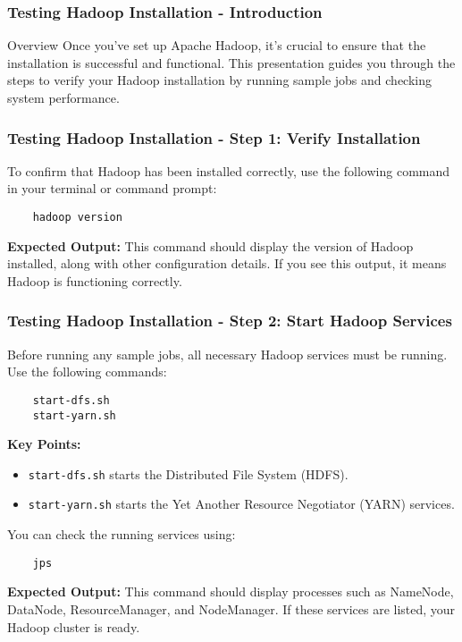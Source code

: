 \documentclass{beamer}
\begin{document}
\begin{frame}
    \frametitle{Testing Hadoop Installation - Introduction}
    \begin{block}{Overview}
        Once you've set up Apache Hadoop, it's crucial to ensure that the installation is successful and functional. 
        This presentation guides you through the steps to verify your Hadoop installation by running sample jobs and checking system performance.
    \end{block}
\end{frame}

\begin{frame}[fragile]
    \frametitle{Testing Hadoop Installation - Step 1: Verify Installation}
    To confirm that Hadoop has been installed correctly, use the following command in your terminal or command prompt:

    \begin{lstlisting}
    hadoop version
    \end{lstlisting}

    \textbf{Expected Output:} 
    This command should display the version of Hadoop installed, along with other configuration details. If you see this output, it means Hadoop is functioning correctly.
\end{frame}

\begin{frame}[fragile]
    \frametitle{Testing Hadoop Installation - Step 2: Start Hadoop Services}
    Before running any sample jobs, all necessary Hadoop services must be running. Use the following commands:

    \begin{lstlisting}
    start-dfs.sh
    start-yarn.sh
    \end{lstlisting}

    \textbf{Key Points:}
    \begin{itemize}
        \item \texttt{start-dfs.sh} starts the Distributed File System (HDFS).
        \item \texttt{start-yarn.sh} starts the Yet Another Resource Negotiator (YARN) services.
    \end{itemize}

    You can check the running services using:

    \begin{lstlisting}
    jps
    \end{lstlisting}

    \textbf{Expected Output:} 
    This command should display processes such as NameNode, DataNode, ResourceManager, and NodeManager. If these services are listed, your Hadoop cluster is ready.
\end{frame}
\end{document}
